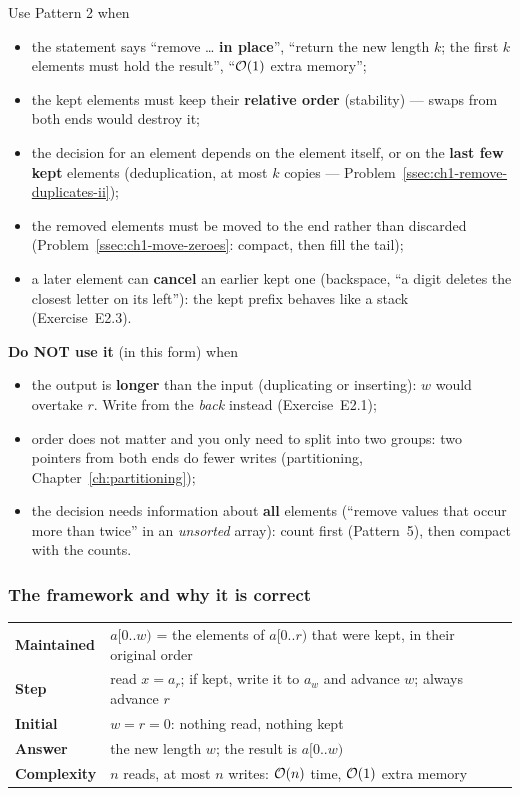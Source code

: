 Use Pattern 2 when
\begin{itemize}[leftmargin=*]
    \item the statement says ``remove \ldots{} \textbf{in place}'', ``return the new length $k$; the first $k$ elements must hold the result'', ``$\mathcal{O}(1)$ extra memory'';
    \item the kept elements must keep their \textbf{relative order} (stability) --- swaps from both ends would destroy it;
    \item the decision for an element depends on the element itself, or on the \textbf{last few kept} elements (deduplication, at most $k$ copies --- Problem~\ref{ssec:ch1-remove-duplicates-ii});
    \item the removed elements must be moved to the end rather than discarded (Problem~\ref{ssec:ch1-move-zeroes}: compact, then fill the tail);
    \item a later element can \textbf{cancel} an earlier kept one (backspace, ``a digit deletes the closest letter on its left''): the kept prefix behaves like a stack (Exercise~E2.3).
\end{itemize}

\textbf{Do NOT use it} (in this form) when
\begin{itemize}[leftmargin=*]
    \item the output is \textbf{longer} than the input (duplicating or inserting): $w$ would overtake $r$. Write from the \emph{back} instead (Exercise~E2.1);
    \item order does not matter and you only need to split into two groups: two pointers from both ends do fewer writes (partitioning, Chapter~\ref{ch:partitioning});
    \item the decision needs information about \textbf{all} elements (``remove values that occur more than twice'' in an \emph{unsorted} array): count first (Pattern~5), then compact with the counts.
\end{itemize}

\subsubsection*{The framework and why it is correct}

\begin{table}[H]
\centering\small
\renewcommand{\arraystretch}{1.25}
\begin{tabularx}{\linewidth}{@{}>{\bfseries}l X@{}}
\toprule
Maintained & $a[0..w)$ = the elements of $a[0..r)$ that were kept, in their original order \\
Step & read $x = a_r$; if kept, write it to $a_w$ and advance $w$; always advance $r$ \\
Initial & $w = r = 0$: nothing read, nothing kept \\
Answer & the new length $w$; the result is $a[0..w)$ \\
Complexity & $n$ reads, at most $n$ writes: $\mathcal{O}(n)$ time, $\mathcal{O}(1)$ extra memory \\
\bottomrule
\end{tabularx}
\end{table}

